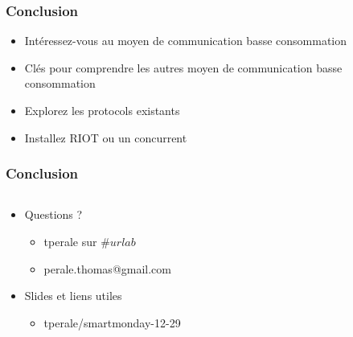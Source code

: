 \begin{frame}
\frametitle{Conclusion}
\begin{itemize}
  \item Intéressez-vous au moyen de communication basse consommation
  \item Clés pour comprendre les autres moyen de
    communication basse consommation
  \item Explorez les protocols existants
  \item Installez RIOT ou un concurrent
\end{itemize}
\end{frame}

\begin{frame}
\frametitle{Conclusion}
\begin{columns}
\begin{column}{0.5\textwidth}
\begin{itemize}
  \item Questions ?
  \begin{itemize}
    \item tperale sur $\#urlab$
    \item perale.thomas@gmail.com
  \end{itemize}
  \item Slides et liens utiles
  \begin{itemize}
    \item tperale/smartmonday-12-29
  \end{itemize}
\end{itemize}
\end{column}
\begin{column}{0.5\textwidth}
\end{column}
\end{columns}
\end{frame}
